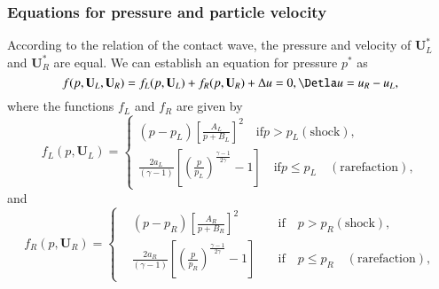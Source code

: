 \documentclass[review]{elsarticle}
\begin{document}
\subsubsection{Equations for pressure and particle velocity}
According to the relation of the contact wave, the pressure and velocity of $\mathbf{U}_L^*$ and $\mathbf{U}_R^*$ are equal. We can establish an equation for pressure $p^*$ as 
\begin{equation}
  f(p,\mathbf{U}_L,\mathbf{U}_R) = f_L(p,\mathbf{U}_L) + f_R(p,\mathbf{U}_R) + \Delta u = 0, \Detla u = u_R -u_L,
\end{equation}
where the functions $f_L$ and $f_R$ are given by
\begin{equation}
  f_L(p,\mathbf{U}_L) = \left\{ \begin{aligned} 
	  (p-p_L)\left[ \frac{A_L}{p+B_L}\right]^2 \quad \text{if} p>p_L (\text{shock}),\\ 
	  \frac{2a_L}{(\gamma -1)}\left[ \left(\frac{p}{p_L}\right)^{\frac{\gamma -1}{2\gamma}} - 1\right] \quad \text{if} p\le p_L \quad (\text{rarefaction}),
  \end{aligned} \right.
\end{equation}
and
\begin{equation}
  f_R(p,\mathbf{U}_R) = \left\{ \begin{aligned} 
	 & (p-p_R)\left[ \frac{A_R}{p+B_R}\right]^2 \quad  & \text{if}\quad   p>p_R (\text{shock}),\\ 
	 &  \frac{2a_R}{(\gamma -1)}\left[ \left(\frac{p}{p_R}\right)^{\frac{\gamma -1}{2\gamma}} - 1\right] \quad  & \text{if} \quad p\le p_R \quad (\text{rarefaction}),
  \end{aligned} \right.
\end{equation}








  \appendix
  \renewcommand{\appendixname}{Appendix~}
\end{document}
